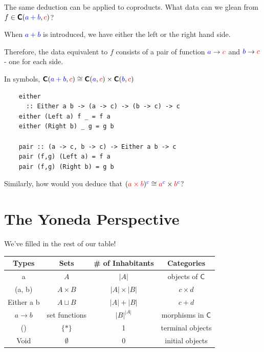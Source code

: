 \documentclass[tikz]{beamer}
\newcommand{\cat}[1]{\bm{ \mathsf{#1} }}
\newcommand{\cc}{\cat{C}}
\newcommand{\red}[1]{\textcolor{red}{#1}}
\newcommand{\blue}[1]{\textcolor{blue}{#1}}
\newcommand{\mblue}[1]{\textcolor{blue}{$#1$}}
\theoremstyle{definition}
\begin{document}
\frame
{
	The same deduction can be applied to coproducts. What data can we glean from $f \in \cc(\blue{a + b}, \red{c})$? 
}

\frame
{
	When \mblue{a + b} is introduced, we have either the left or the right hand side.
	
	Therefore, the data equivalent to $f$ consists of a pair of function $\blue{a} \to \red{c}$ and $\blue{b} \to \red{c}$ - one for each side. 
}

\frame
{
	In symbols, $\cc(\blue{a + b}, \red{c}) \cong \cc(\blue{a}, \red{c}) \times \cc(\blue{b}, \red{c})$
}

\begin{frame}[fragile]
	\begin{verbatim}
	either 
	  :: Either a b -> (a -> c) -> (b -> c) -> c
	either (Left a) f _ = f a
	either (Right b) _ g = g b
	
	pair :: (a -> c, b -> c) -> Either a b -> c
	pair (f,g) (Left a) = f a
	pair (f,g) (Right b) = g b
	\end{verbatim}
\end{frame}

\frame
{
	Similarly, how would you deduce that $(\red{a \times b})^{\blue{c}} \cong \red{a}^{\blue{c}} \times \red{b}^{\blue{c}}$?
}

\section{The Yoneda Perspective}


\begin{frame}
	We've filled in the rest of our table! 	
	
	\begin{center}
		\begin{tabular}{|c|c|c|c|}
		\hline
		Types & Sets & \# of Inhabitants & Categories \\
		\hline
			a       & $A$ & $|A|$  & objects of $\cc$ \\
			(a, b) & $A \times B$ & $|A| \times |B|$ & $c \times d$ \\
			Either a b & $A \sqcup B$ & $|A| + |B|$ & $c + d$ \\
			$a \to b$ &  set functions & $|B|^{|A|}$ & morphisms in $\cc$ \\
			() & $\{*\}$ & 1 & terminal objects \\
			Void & $\emptyset$ & 0 & initial objects \\ \hline
		\end{tabular}
	\end{center}
\end{frame}
\end{document}
